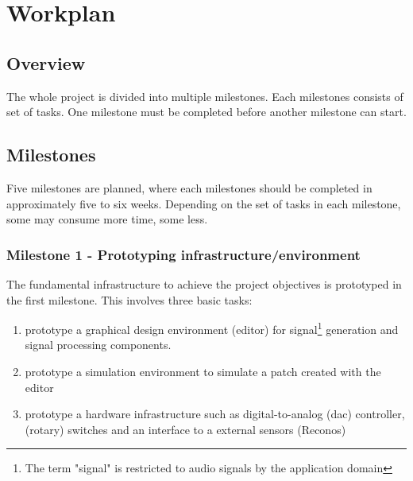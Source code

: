 
\chapter{Workplan}
\label{chapter:Workplan}

\section{Overview}


The whole project is divided into multiple milestones. Each milestones consists of set of tasks. One milestone must be completed before another milestone can start.

\section{Milestones}

Five milestones are planned, where each milestones should be completed in approximately five to six weeks. Depending on the set of tasks in each milestone, some may consume more time, some less.

\subsection{Milestone 1 - Prototyping infrastructure/environment}

The fundamental infrastructure to achieve the project objectives is prototyped in the first milestone. This involves three basic tasks:

\begin{enumerate}
	\item prototype a graphical design environment (editor) for signal\footnote{The term "signal" is restricted to audio signals by the application domain} generation and signal processing components. 
	\item prototype a simulation environment to simulate a patch created with the editor
	\item prototype a hardware infrastructure such as digital-to-analog (dac) controller, (rotary) switches and an interface to a external sensors (Reconos)
\end{enumerate}

